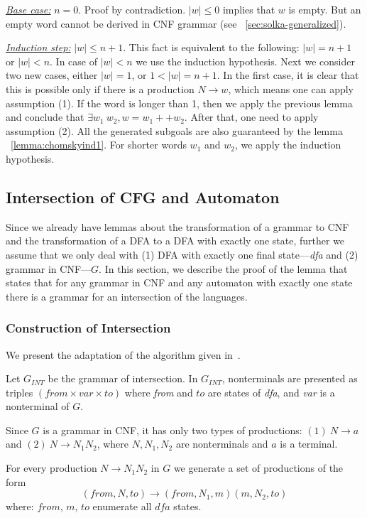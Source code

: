 \underline{\textit{Base case:}} $ n = 0 $. Proof by contradiction. $|w| \le 0$ implies that $w$ is empty. But an empty word cannot be derived in CNF grammar (see ~\ref{sec:solka-generalized}).

\underline{\textit{Induction step:}} $|w| \le n+1$. This fact is equivalent to the following:  $|w| = n+1$ or $|w| < n$. 
In case of $|w| < n$ we use the induction hypothesis.
Next we consider two new cases, either $|w| = 1 $, or $1 < |w| = n + 1$.
In the first case, it is clear that this is possible only if there is a production $N \to w$, which means one can apply assumption (1).
If the word is longer than 1, then we apply the previous lemma and conclude that $\exists w_1 \ w_2, w = w_1 ++ w_2$. After that,
one need to apply assumption (2). All the generated subgoals are also guaranteed by the lemma ~\ref{lemma:chomskyind1}. 
For shorter words $w_1$ and $w_2$, we apply the induction hypothesis.

\subsection{Intersection of CFG and Automaton}

Since we already have lemmas about the transformation of a grammar to CNF and the transformation of a DFA to a DFA with exactly one state, further we assume that we only deal with (1) DFA with exactly one final state---\textit{dfa} and (2) grammar in CNF---$G$. In this section, we describe the proof of the lemma that states that for any grammar in CNF and any automaton with exactly one state there is a grammar for an intersection of the languages.

\subsubsection{Construction of Intersection}

We present the adaptation of the algorithm given in~\cite{beigelproof}. 

Let $G_{INT}$ be the grammar of intersection. In $G_{INT}$, nonterminals are presented as triples $(from \times var \times to) $ where \textit{from} and $to$ are states of \textit{dfa}, and \textit{var} is a nonterminal of $G$.

Since $G$ is a grammar in CNF, it has only two types of productions: $(1)\ N \to a $ and $(2) \ N \to N_{1} N_{2}$, where $N, N_1, N_2$ are nonterminals and $a$ is a terminal.

For every production $N \to N_1 N_2$ in $G$ we generate a set of productions of the form $$(from, N, to) \to (from, N_1,  m) (m, N_2, to)$$ where: $from$, $m$, $to$ enumerate all $\textit{dfa}$ states.

